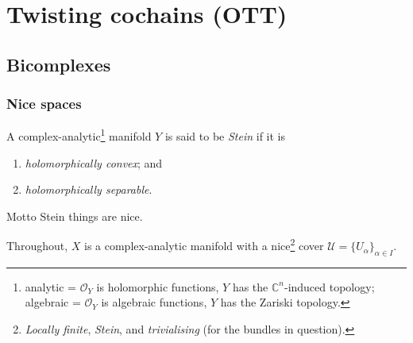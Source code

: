 \documentclass{beamer}
\begin{document}
    \section{Twisting cochains (OTT)}

        \subsection{Bicomplexes}

            \begin{frame}\frametitle{Nice spaces}
                \begin{definition}
                    A complex-analytic\footnote{analytic = $\mathcal{O}_Y$ is holomorphic functions, $Y$ has the $\mathbb{C}^n$-induced topology; algebraic = $\mathcal{O}_Y$ is algebraic functions, $Y$ has the Zariski topology.} manifold $Y$ is said to be \emph{Stein} if it is
                    \begin{enumerate}
                        \item \emph{holomorphically convex}; and
                        \item \emph{holomorphically separable}.
                    \end{enumerate}
                \end{definition}

                \pause

                \begin{block}{Motto}
                    Stein things are nice.
                \end{block}

                \pause

                Throughout, $X$ is a complex-analytic manifold with a nice\footnote{\emph{Locally finite}, \emph{Stein}, and \emph{trivialising} (for the bundles in question).} cover $\mathcal{U}=\{U_\alpha\}_{\alpha\in I}$.
            \end{frame}
\end{document}
